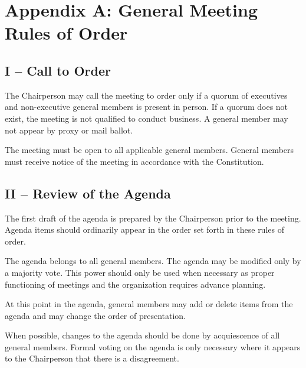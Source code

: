 \documentclass[12pt,a4paper]{article}
\begin{document}
\section*{Appendix A: General Meeting Rules of Order}

\subsection*{I – Call to Order}

\begin{constitutionlist}
\item The Chairperson may call the meeting to order only if a quorum of executives and non-executive general members is present in person. If a quorum does not exist, the meeting is not qualified to conduct business. A general member may not appear by proxy
or mail ballot.

\item The meeting must be open to all applicable general members. General members must receive notice of the meeting in accordance with the Constitution.
\end{constitutionlist}

\subsection*{II – Review of the Agenda}

\begin{constitutionlist}
\item The first draft of the agenda is prepared by the Chairperson prior to the meeting. Agenda items should ordinarily appear in the order set forth in these rules of order.

\item The agenda belongs to all general members. The agenda may be modified only by a majority vote. This power should only be used when necessary as proper functioning of meetings and the organization requires advance planning.

\item At this point in the agenda, general members may add or delete items from the agenda and may change the order of presentation.

\item When possible, changes to the agenda should be done by acquiescence of all general members. Formal voting on the agenda is only necessary where it appears to the Chairperson that there is a disagreement.
\end{constitutionlist}
\end{document}
